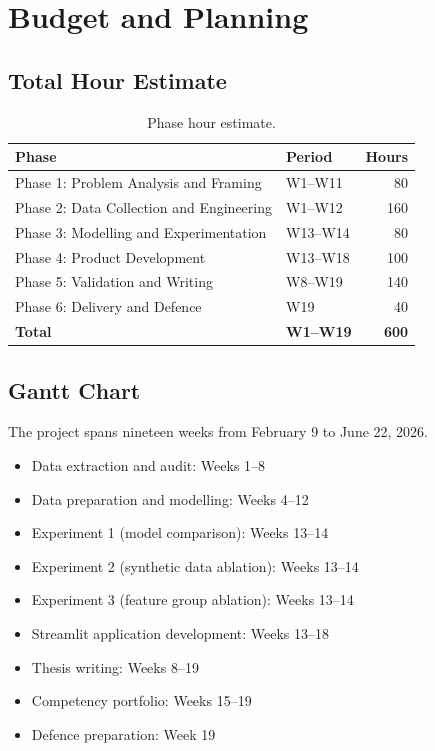 \documentclass[11pt,a4paper]{article}
\begin{document}
\section{Budget and Planning}

\subsection{Total Hour Estimate}

\begin{table}[H]
  \centering
  \caption{Phase hour estimate.}
  \label{tab:budget}
  \begin{tabular}{llr}
    \toprule
    \textbf{Phase} & \textbf{Period} & \textbf{Hours} \\
    \midrule
    Phase 1: Problem Analysis and Framing  & W1--W11  & 80  \\
    Phase 2: Data Collection and Engineering & W1--W12  & 160 \\
    Phase 3: Modelling and Experimentation & W13--W14 & 80  \\
    Phase 4: Product Development           & W13--W18 & 100 \\
    Phase 5: Validation and Writing        & W8--W19  & 140 \\
    Phase 6: Delivery and Defence          & W19       & 40  \\
    \midrule
    \textbf{Total}                         & \textbf{W1--W19} & \textbf{600} \\
    \bottomrule
  \end{tabular}
\end{table}


\subsection{Gantt Chart}

The project spans nineteen weeks from February 9 to June 22, 2026.

\begin{itemize}
  \item Data extraction and audit: Weeks 1--8
  \item Data preparation and modelling: Weeks 4--12
  \item Experiment 1 (model comparison): Weeks 13--14
  \item Experiment 2 (synthetic data ablation): Weeks 13--14
  \item Experiment 3 (feature group ablation): Weeks 13--14
  \item Streamlit application development: Weeks 13--18
  \item Thesis writing: Weeks 8--19
  \item Competency portfolio: Weeks 15--19
  \item Defence preparation: Week 19
\end{itemize}
\end{document}
